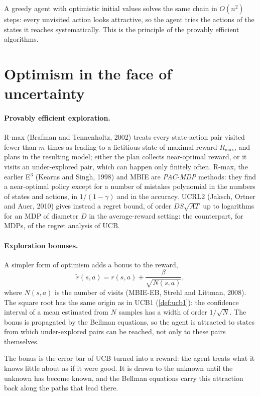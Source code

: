 A greedy agent with optimistic initial values solves the same chain in
$O(n^2)$ steps: every unvisited action looks attractive, so the agent
tries the actions of the states it reaches systematically. This is the
principle of the provably efficient algorithms.

\section{Optimism in the face of uncertainty}

\paragraph{Provably efficient exploration.} R-max (Brafman and
Tennenholtz, 2002) treats every state-action pair visited fewer than $m$
times as leading to a fictitious state of maximal reward $R_{\max}$, and
plans in the resulting model; either the plan collects near-optimal reward,
or it visits an under-explored pair, which can happen only finitely often.
R-max, the earlier E$^3$ (Kearns and Singh, 1998) and MBIE are
\emph{PAC-MDP} methods: they find a near-optimal policy except for a number
of mistakes polynomial in the numbers of states and actions, in $1 / (1 -
\gamma)$ and in the accuracy. UCRL2 (Jaksch, Ortner and Auer, 2010) gives
instead a regret bound, of order $D S \sqrt{A T}$ up to logarithms for an
MDP of diameter $D$ in the average-reward setting: the counterpart, for
MDPs, of the regret analysis of UCB.

\paragraph{Exploration bonuses.} A simpler form of optimism adds a bonus
to the reward,
\begin{equation}
  \label{eq:bonus}
  \tilde r(s, a) = r(s, a) + \frac{\beta}{\sqrt{N(s, a)}},
\end{equation}
where $N(s, a)$ is the number of visits (MBIE-EB, Strehl and Littman,
2008). The square root has the same origin as in UCB1 (\cref{def:ucb1}):
the confidence interval of a mean estimated from $N$ samples has a width
of order $1 / \sqrt{N}$. The bonus is propagated by the Bellman equations,
so the agent is attracted to states from which under-explored pairs can be
reached, not only to these pairs themselves.

\begin{intuition}
  The bonus is the error bar of UCB turned into a reward: the agent treats
  what it knows little about as if it were good. It is drawn to the
  unknown until the unknown has become known, and the Bellman equations
  carry this attraction back along the paths that lead there.
\end{intuition}

